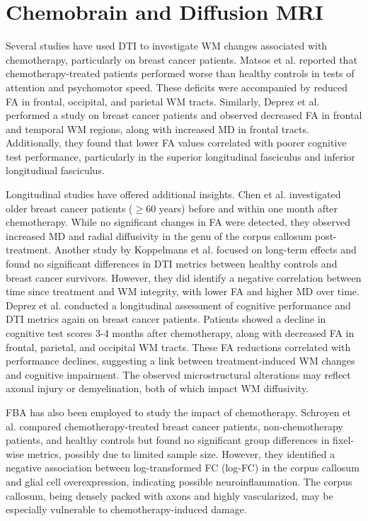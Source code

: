 \section{Chemobrain and Diffusion MRI}

Several studies have used DTI to investigate WM changes associated with chemotherapy, particularly on breast cancer patients. Matsos et al. \cite{Matsos2017} reported that chemotherapy-treated patients performed worse than healthy controls in tests of attention and psychomotor speed. These deficits were accompanied by reduced FA in frontal, occipital, and parietal WM tracts. Similarly, Deprez et al. \cite{Deprez2011} performed a study on breast cancer patients and observed decreased FA in frontal and temporal WM regions, along with increased MD in frontal tracts. Additionally, they found that lower FA values correlated with poorer cognitive test performance, particularly in the superior longitudinal fasciculus and inferior longitudinal fasciculus.

Longitudinal studies have offered additional insights. Chen et al. \cite{Chen2020} investigated older breast cancer patients ($\geq$60 years) before and within one month after chemotherapy. While no significant changes in FA were detected, they observed increased MD and radial diffusivity in the genu of the corpus callosum post-treatment. Another study by Koppelmans et al. \cite{Koppelmans2014} focused on long-term effects and found no significant differences in DTI metrics between healthy controls and breast cancer survivors. However, they did identify a negative correlation between time since treatment and WM integrity, with lower FA and higher MD over time.
Deprez et al. \cite{Deprez2012} conducted a longitudinal assessment of cognitive performance and DTI metrics again on breast cancer patients. Patients showed a decline in cognitive test scores 3-4 months after chemotherapy, along with decreased FA in frontal, parietal, and occipital WM tracts. These FA reductions correlated with performance declines, suggesting a link between treatment-induced WM changes and cognitive impairment. The observed microstructural alterations may reflect axonal injury or demyelination, both of which impact WM diffusivity.

FBA has also been employed to study the impact of chemotherapy. Schroyen et al. \cite{Schroyen2021} compared chemotherapy-treated breast cancer patients, non-chemotherapy patients, and healthy controls but found no significant group differences in fixel-wise metrics, possibly due to limited sample size. However, they identified a negative association between log-transformed FC (log-FC) in the corpus callosum and glial cell overexpression, indicating possible neuroinflammation. The corpus callosum, being densely packed with axons and highly vascularized, may be especially vulnerable to chemotherapy-induced damage.


